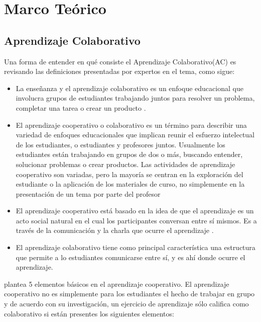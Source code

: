 \chapter{Marco Teórico}
\section{Aprendizaje Colaborativo}
Una forma de entender en qué consiste el Aprendizaje Colaborativo(AC) es revisando las definiciones presentadas por expertos en el tema, como sigue:
\begin{itemize}
  \item La enseñanza y el aprendizaje colaborativo es un enfoque educacional que involucra grupos de estudiantes trabajando juntos para resolver un problema, completar una tarea o crear un producto \cite{macgregor_collaborative_1990}.
  \item El aprendizaje cooperativo o colaborativo es un término para describir una variedad de enfoques educacionales que implican reunir el esfuerzo intelectual de los estudiantes, o estudiantes y profesores juntos. Usualmente los estudiantes están trabajando en grupos de dos o más, buscando entender, solucionar problemas o crear productos. Las actividades de aprendizaje cooperativo son variadas, pero la mayoría se centran en la exploración del estudiante o la aplicación de los materiales de curso, no simplemente en la presentación de un tema por parte del profesor \cite{smith_collaborative_1992}
  \item El aprendizaje cooperativo está basado en la idea de que el aprendizaje es un acto social natural en el cual los participantes conversan entre sí mismos. Es a través de la comunicación y la charla que ocurre el aprendizaje \cite{gerlach_1994}.
  \item El aprendizaje colaborativo tiene como principal característica una estructura que permite a lo estudiantes comunicarse entre sí, y es ahí donde ocurre el aprendizaje\cite{golub1988focus}.

\end{itemize}

\cite{johnson_1984} plantea 5 elementos básicos en el aprendizaje cooperativo. El aprendizaje cooperativo no es simplemente para los estudiantes el hecho de trabajar en grupo y de acuerdo con su investigación,  un ejercicio de aprendizaje sólo califica como colaborativo si están presentes los siguientes elementos:

